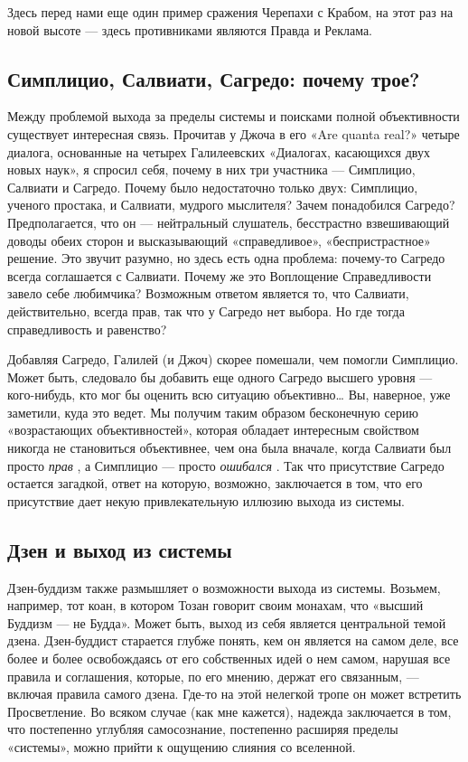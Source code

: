 \documentclass[../main.tex]{subfiles}
\begin{document}
Здесь перед нами еще один пример сражения Черепахи с Крабом, на этот раз на новой высоте --- здесь противниками являются Правда и Реклама.


\subsection{Симплицио, Салвиати, Сагредо: почему трое?}

Между проблемой выхода за пределы системы и поисками полной объективности существует интересная связь. Прочитав у Джоча в его «Are quanta real?» четыре диалога, основанные на четырех Галилеевских «Диалогах, касающихся двух новых наук», я спросил себя, почему в них три участника --- Симплицио, Салвиати и Сагредо. Почему было недостаточно только двух: Симплицио, ученого простака, и Салвиати, мудрого мыслителя? Зачем понадобился Сагредо? Предполагается, что он --- нейтральный слушатель, бесстрастно взвешивающий доводы обеих сторон и высказывающий «справедливое», «беспристрастное» решение. Это звучит разумно, но здесь есть одна проблема: почему-то Сагредо всегда соглашается с Салвиати. Почему же это Воплощение Справедливости завело себе любимчика? Возможным ответом является то, что Салвиати, действительно, всегда прав, так что у Сагредо нет выбора. Но где тогда справедливость и равенство?

Добавляя Сагредо, Галилей (и Джоч) скорее помешали, чем помогли Симплицио. Может быть, следовало бы добавить еще одного Сагредо высшего уровня --- кого-нибудь, кто мог бы оценить всю ситуацию объективно\ldots{} Вы, наверное, уже заметили, куда это ведет. Мы получим таким образом бесконечную серию «возрастающих объективностей», которая обладает интересным свойством никогда не становиться объективнее, чем она была вначале, когда Салвиати был просто \emph{прав} , а Симплицио --- просто \emph{ошибался} . Так что присутствие Сагредо остается загадкой, ответ на которую, возможно, заключается в том, что его присутствие дает некую привлекательную иллюзию выхода из системы.


\subsection{Дзен и выход из системы}

Дзен-буддизм также размышляет о возможности выхода из системы. Возьмем, например, тот коан, в котором Тозан говорит своим монахам, что «высший Буддизм --- не Будда». Может быть, выход из себя является центральной темой дзена. Дзен-буддист старается глубже понять, кем он является на самом деле, все более и более освобождаясь от его собственных идей о нем самом, нарушая все правила и соглашения, которые, по его мнению, держат его связанным, --- включая правила самого дзена. Где-то на этой нелегкой тропе он может встретить Просветление. Во всяком случае (как мне кажется), надежда заключается в том, что постепенно углубляя самосознание, постепенно расширяя пределы «системы», можно прийти к ощущению слияния со вселенной.
\end{document}
